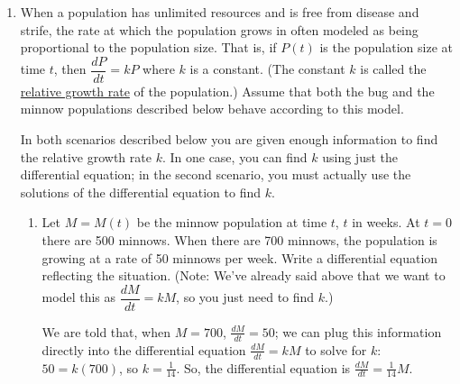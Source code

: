 \documentclass{article}
\begin{document}
\begin{enumerate}
\begin{enumerate}
    \begin{solution}
      The differential equation $\frac{dy}{dt} = y^3$ says that $y$ is an
      antiderivative of $y^3$; the problem is that $y$ is a function that
      we don't know yet, so we don't have a concrete function to
      anti-differentiate.
    \end{solution}

  \end{enumerate}

\item 


  When a population has unlimited resources and is free from
  disease and strife, the rate at which the population grows in often
  modeled as being proportional to the population size.  That is, if
  $P(t)$ is the population size at time $t$, then $\dfrac{dP}{dt} = kP$
  where $k$ is a constant.  (The constant $k$ is called the
  \uline{relative growth rate} of the population.)  Assume that both the
  bug and the minnow populations described below behave according to this
  model.

  In both scenarios described below you are given enough information to
  find the relative growth rate $k$. In one case, you can find $k$ using
  just the differential equation; in the second scenario, you must
  actually use the solutions of the differential equation to find $k$.

  \begin{enumerate}

  \item
    \begin{problem}[\vfill]
      Let $M=M(t)$ be the minnow population at time $t$, $t$ in weeks. At
      $t=0$ there are 500 minnows.  When there are 700 minnows, the
      population is growing at a rate of 50 minnows per week.  Write a
      differential equation reflecting the situation.  (Note: We've
      already said above that we want to model this as $\dfrac{dM}{dt} =
      kM$, so you just need to find $k$.)
    \end{problem}

    \begin{solution}
      We are told that, when $M = 700$, $\frac{dM}{dt} = 50$; we can plug
      this information directly into the differential equation
      $\frac{dM}{dt} = kM$ to solve for $k$: $50 = k (700)$, so $k =
      \frac{1}{14}$.  So, the differential equation is
      $\boxed{\frac{dM}{dt} = \frac{1}{14}M}$.
    \end{solution}


\end{enumerate}
\end{enumerate}
\end{document}
